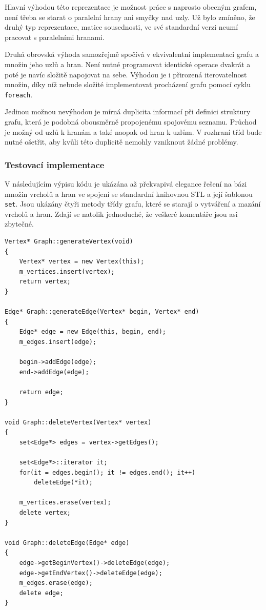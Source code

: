 \documentclass[11pt,twoside,a4paper]{book}
\begin{document}
Hlavní výhodou této reprezentace je možnost práce s naprosto obecným grafem, není třeba se starat o paralelní hrany ani smyčky nad uzly. Už bylo zmíněno, že druhý typ reprezentace, matice sousednosti, ve své standardní verzi neumí pracovat s paralelními hranami.

Druhá obrovská výhoda samozřejmě spočívá v ekvivalentní implementaci grafu a množin jeho uzlů a hran. Není nutné programovat identické operace dvakrát a poté je navíc složitě napojovat na sebe. Výhodou je i přirozená iterovatelnost množin, díky níž nebude složité implementovat procházení grafu pomocí cyklu \texttt{foreach}.

Jedinou možnou nevýhodou je mírná duplicita informací při definici struktury gra\-fu, která je podobná obousměrně propojenému spojovému seznamu. Průchod je možný od uzlů k hranám a také naopak od hran k uzlům. V rozhraní tříd bude nutné ošetřit, aby kvůli této duplicitě nemohly vzniknout žádné problémy.


\subsubsection{Testovací implementace}

V následujícím výpisu kódu je ukázána až překvapivá elegance řešení na bázi množin vrcholů a hran ve spojení se standardní knihovnou STL a její šablonou \texttt{set}. Jsou ukázány čtyři metody třídy grafu, které se starají o vytváření a mazání vrcholů a hran. Zdají se natolik jednoduché, že veškeré komentáře jsou asi zbytečné.

\begin{verbatim}
Vertex* Graph::generateVertex(void)
{
    Vertex* vertex = new Vertex(this);
    m_vertices.insert(vertex);
    return vertex;
}

Edge* Graph::generateEdge(Vertex* begin, Vertex* end)
{
    Edge* edge = new Edge(this, begin, end);
    m_edges.insert(edge);

    begin->addEdge(edge);
    end->addEdge(edge);

    return edge;
}

void Graph::deleteVertex(Vertex* vertex)
{
    set<Edge*> edges = vertex->getEdges();

    set<Edge*>::iterator it;
    for(it = edges.begin(); it != edges.end(); it++)
        deleteEdge(*it);

    m_vertices.erase(vertex);
    delete vertex;
}

void Graph::deleteEdge(Edge* edge)
{
    edge->getBeginVertex()->deleteEdge(edge);
    edge->getEndVertex()->deleteEdge(edge);
    m_edges.erase(edge);
    delete edge;
}
\end{verbatim}
\end{document}
